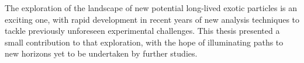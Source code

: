 The exploration of the landscape of new potential long-lived exotic particles is an exciting one, with rapid development in recent years of new analysis techniques to tackle previously unforeseen experimental challenges.
This thesis presented a small contribution to that exploration, with the hope of illuminating paths to new horizons yet to be undertaken by further studies.
